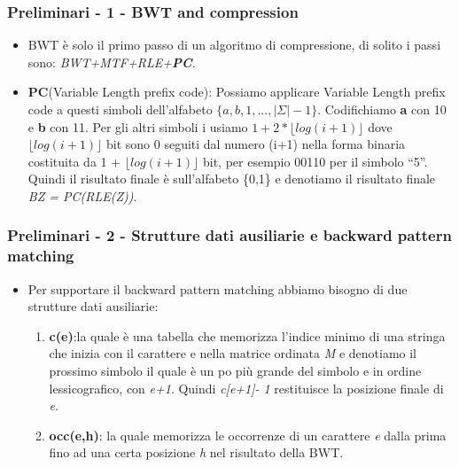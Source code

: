 \documentclass{beamer}
\begin{document}
\begin{frame}
\frametitle{Preliminari - 1 - BWT and compression}
\begin{itemize}
	\item BWT è solo il primo passo di un algoritmo di compressione, di solito i passi sono: \textit{BWT+MTF+RLE+\textbf{PC}.}\pause
	\item \textbf{PC}(Variable Length prefix code): Possiamo applicare Variable Length prefix code a questi simboli dell'alfabeto $ \{a,b,1,...,|\Sigma| -1\} $. Codifichiamo \textbf{a}  con 10 e \textbf{b}  con 11. Per gli altri simboli i usiamo $ 1+2* \lfloor log(i+1) \rfloor $  dove  $\lfloor log(i+1) \rfloor$   bit  sono 0 seguiti dal numero (i+1)  nella forma binaria costituita da 1 +  $\lfloor log(i+1) \rfloor$   bit, per esempio 00110 per il simbolo ``5''. Quindi il risultato finale è sull’alfabeto \{0,1\} e denotiamo il risultato finale \textit{BZ = PC(RLE(Z))}.
	
\end{itemize}
\end{frame}

\begin{frame}
\frametitle{Preliminari - 2 - Strutture dati ausiliarie e backward pattern matching}
\begin{itemize}
	\item Per supportare il backward pattern matching abbiamo bisogno di due strutture dati ausiliarie:\pause
	\begin{enumerate}
		\item \textbf{c(e)}:la quale è una tabella che memorizza l'indice minimo di una stringa che inizia con il carattere e nella matrice ordinata \textit{M} e denotiamo il prossimo simbolo il quale è un po più grande del simbolo e  in ordine lessicografico, con \textit{e+1}. Quindi \textit{c[e+1]- 1} restituisce la posizione finale di \textit{e}.\pause
		\item \textbf{occ(e,h)}: la quale memorizza le occorrenze di un carattere \textit{e} dalla prima fino ad una certa posizione \textit{h} nel risultato della BWT. 
	\end{enumerate}
\end{itemize}
\end{frame}
\end{document}
